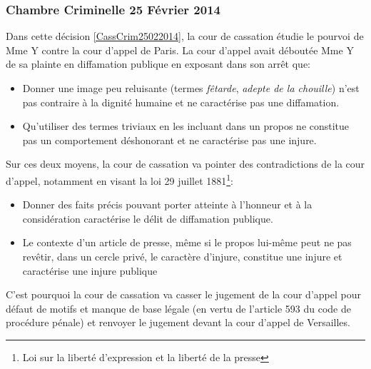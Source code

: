\documentclass[math]{cours}
\begin{document}
\subsubsection{Chambre Criminelle 25 Février 2014}
Dans cette décision \ref{CassCrim25022014}, la cour de cassation étudie le pourvoi de Mme Y contre la cour d'appel de Paris.
La cour d'appel avait déboutée Mme Y de sa plainte en diffamation publique en exposant dans son arrêt que:
\begin{itemize}
	\item Donner une image peu reluisante (termes \textit{fêtarde}, \textit{adepte de la chouille}) n'est pas contraire à la dignité humaine et ne caractérise pas une diffamation.
	\item Qu'utiliser des termes triviaux en les incluant dans un propos ne constitue pas un comportement déshonorant et ne caractérise pas une injure.
\end{itemize}
Sur ces deux moyens, la cour de cassation va pointer des contradictions de la cour d'appel, notamment en visant la loi 29 juillet 1881\footnote{Loi sur la liberté d'expression et la liberté de la presse}:
\begin{itemize}
	\item Donner des faits précis pouvant porter atteinte à l'honneur et à la considération caractérise le délit de diffamation publique.
	\item Le contexte d'un article de presse, même si le propos lui-même peut ne pas revêtir, dans un cercle privé, le caractère d'injure, constitue une injure et caractérise une injure publique
\end{itemize}
C'est pourquoi la cour de cassation va casser le jugement de la cour d'appel pour défaut de motifs et manque de base légale (en vertu de l'article 593 du code de procédure pénale) et renvoyer le jugement devant la cour d'appel de Versailles.
\end{document}
